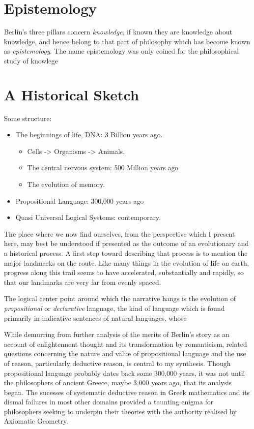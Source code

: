 \section{Epistemology}

Berlin's three pillars concern \emph{knowledge}, if known they are knowledge about knowledge, and hence belong to that part of philosophy which has become known as \emph{epistemology}.
The name epistemology was only coined for the philosophical study of knowlege





\section{A Historical Sketch}

Some structure:

\begin{itemize}
\item The beginnings of life, DNA: 3 Billion years ago.
\begin{itemize}
\item Cells -> Organisms -> Animals.
\item The central nervous system: 500 Million years ago
\item The evolution of memory.
\end{itemize}
\item Propositional Language: 300,000 years ago
\item Quasi Universal Logical Systems: contemporary.
\end{itemize}

The place where we now find ourselves, from the perspective which I present here, may best be understood if presented as the outcome of an evolutionary and a historical process.
A first step toward describing that process is to mention the major landmarks on the route.
Like many things in the evolution of life on earth, progress along this trail seems to have accelerated, substantially and rapidly, so that our landmarks are very far from evenly spaced.

The logical center point around which the narrative hangs is the evolution of \emph{propositional} or \emph{declarative} language, the kind of language which is found primarily in indicative sentences of natural languages, whose 

While demurring from further analysis of the merits of Berlin's story as an account of enlightennent thought and its transformation by romanticism, related questions concerning the nature and value of propositional language and the use of reason, particularly deductive reason, is central to my synthesis.
Though propositional language probably dates back some 300,000 years, it was not until the philosophers of ancient Greece, maybe 3,000 years ago, that its analysis began.
The sucesses of systematic deductive reason in Greek mathematics and its dismal failures in most other domains provided a taunting enigma for philosophers seeking to underpin their theories with the authority realised by Axiomatic Geometry.
